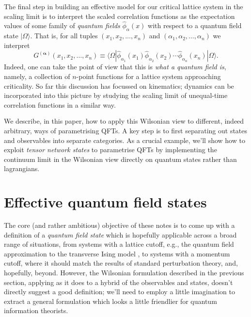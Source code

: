\documentclass[11pt]{amsart}
\theoremstyle{plain}%
\theoremstyle{definition}
\theoremstyle{remark}
\begin{document}
The final step in building an effective model for our critical lattice system in the scaling limit is to interpret the scaled correlation functions as the expectation values of some family of \emph{quantum fields} $\widehat{\phi}_{\alpha}(x)$ with respect to a quantum field state $|\Omega\rangle$. That is, for all tuples $(x_1, x_2, \ldots, x_n)$ and $(\alpha_1, \alpha_2, \ldots, \alpha_n)$ we interpret
\begin{equation}
	G^{(\boldsymbol{\alpha})}(x_1, x_2, \ldots, x_n) \equiv \langle\Omega|\widehat{\phi}_{\alpha_1}(x_1)\widehat{\phi}_{\alpha_2}(x_2)\cdots \widehat{\phi}_{\alpha_n}(x_n)|\Omega\rangle.
\end{equation}
Indeed, one can take the point of view that this is \emph{what a quantum field is}, namely, a collection of $n$-point functions for a lattice system approaching criticality. So far this discussion has focussed on kinematics; dynamics can be incorporated into this picture by studying the scaling limit of unequal-time correlation functions in a similar way.

We describe, in this paper, how to apply this Wilsonian view to different, indeed arbitrary, ways of parametrising QFTs. A key step is to first separating out states and observables into separate categories. As a crucial example, we'll show how to exploit \emph{tensor network states} to parametrise QFTs by implementing the continuum limit in the Wilsonian view directly on quantum states rather than lagrangians.

\section{Effective quantum field states}\label{sec:effectiveqftstates}

The core (and rather ambitious) objective of these notes is to come up with a definition of a \emph{quantum field state} which is hopefully applicable across a broad range of situations, from systems with a lattice cutoff, e.g., the quantum field approximation to the transverse Ising model \cite{sachdev_quantum_2011}, to systems with a momentum cutoff, where it should match the results of standard perturbation theory, and, hopefully, beyond. However, the Wilsonian formulation described in the previous section, applying as it does to a hybrid of the observables and states, doesn't directly suggest a good definition; we'll need to employ a little imagination to extract a general formulation which looks a little friendlier for quantum information theorists. 
\end{document}
